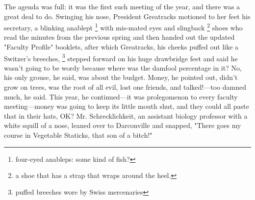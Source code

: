   The agenda was full: it was the first such meeting of the year, and there was
a great deal to do. Swinging his nose, President Greatracks motioned to her feet
his secretary, a blinking anablept 
\footnote{\textdbend four-eyed anableps: some kind of fish?}
with mis-mated eyes and slingback 
\footnote{a shoe that has a strap that wraps around the heel.}
shoes who read the minutes from the previous spring and then handed out the updated
"Faculty Profile" booklets, after which Greatracks, his cheeks puffed out like a
Switzer's breeches, 
\footnote{puffed breeches wore by Swiss mercenaries}
stepped forward on his huge drawbridge 
feet and said he wasn't going to be wordy because where was the damfool 
percentage in it? No, his only grouse, 
he said, was about the budget. Money, he pointed out, didn't grow
on trees, was the root of all evil, lost one friends, and talked!---too damned
much, he said. This year, he continued---it was prolegomenon 
to every faculty meeting---money was going to keep its little mouth shut, 
and they could all paste that in their hats, OK? Mr. Schrecklichkeit, an 
assistant biology professor with a white squill 
of a nose, leaned over to Darconville and snapped, 
"There goes my course in Vegetable Staticks, that son of a bitch!"

